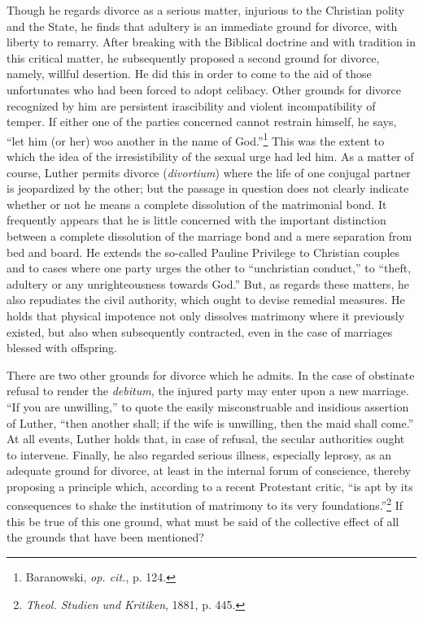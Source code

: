 Though he regards divorce as a serious matter, injurious to the Christian
polity and the State, he finds that adultery is an immediate
ground for divorce, with liberty to remarry. After breaking with
the Biblical doctrine and with tradition in this critical matter, he
subsequently proposed a second ground for divorce, namely, willful
desertion. He did this in order to come to the aid of those unfortunates
who had been forced to adopt celibacy. Other grounds for divorce
recognized by him are persistent irascibility and violent
incompatibility of temper. If either one of the parties concerned cannot
restrain himself, he says, “let him (or her) woo another in the
name of God.”\footnote{Baranowski, \textit{op. cit.}, p. 124.}
This was the extent to which the idea of the irresistibility
of the sexual urge had led him. As a matter of course,
Luther permits divorce (\textit{divortium}) where the life of one conjugal
partner is jeopardized by the other; but the passage in question does
not clearly indicate whether or not he means a complete dissolution
of the matrimonial bond. It frequently appears that he is little concerned
with the important distinction between a complete dissolution
of the marriage bond and a mere separation from bed and board. He
extends the so-called Pauline Privilege to Christian couples and to
cases where one party urges the other to “unchristian conduct,” to
“theft, adultery or any unrighteousness towards God.” But, as regards
these matters, he also repudiates the civil authority, which ought to
devise remedial measures. He holds that physical impotence not only
dissolves matrimony where it previously existed, but also when subsequently
contracted, even in the case of marriages blessed with
offspring.

There are two other grounds for divorce which he admits. In the
case of obstinate refusal to render the \textit{debitum}, the injured party may
enter upon a new marriage. “If you are unwilling,” to quote the easily
misconstruable and insidious assertion of Luther, “then another
shall; if the wife is unwilling, then the maid shall come.” At all
events, Luther holds that, in case of refusal, the secular authorities
ought to intervene. Finally, he also regarded serious illness, especially
leprosy, as an adequate ground for divorce, at least in the internal
forum of conscience, thereby proposing a principle which, according
to a recent Protestant critic, ``is apt by its consequences to shake the
institution of matrimony to its very foundations.''\footnote
{\textit{Theol. Studien und Kritiken}, 1881, p. 445.}
If this be true
of this one ground, what must be said of the collective effect of all
the grounds that have been mentioned?

